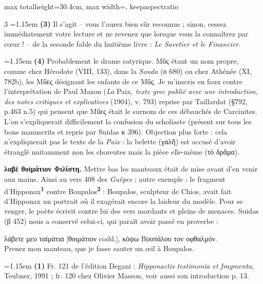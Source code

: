 \documentclass[11pt,twoside]{book}
\newcommand{\italique}[1]{\textit{#1}}
\newcommand{\citComm}[1]{\begin{quoting}[vskip=0.4pt,leftmargin=0.7em,rightmargin=0.2em]#1\end{quoting}}
\newcommand{\francais}[1]{{\policeFr #1}}
\newcommand{\marqueur}[1]{\textsuperscript{\color{rubricRed}\textbf{#1}}}
\begin{document}
\begin{adjustbox}{max totalheight=30.4cm, max width=\textwidth, keepaspectratio}
\begin{minipage}{\textwidth}
{\begin{multicols}{3}
\noindent\hangindent=1.15em {\color{sepiaNote}\textbf{(3)}} Il s'agit – vous l'aurez bien sûr reconnue ; sinon, cessez immédiatement votre lecture et ne revenez que lorsque vous la connaîtrez par cœur ! – de la seconde fable du huitième livre : \italique{Le Savetier et le Financier}.
\par\vspace{1.5pt}
\noindent\hangindent=1.15em {\color{sepiaNote}\textbf{(4)}} Probablement le drame satyrique. Μῦς étant un nom propre, comme chez Hérodote (VIII, 133), dans la \italique{Souda} (ο 680) ou chez Athénée (XI, 782b), les Μῦες désignant les enfants de ce Μῦς. Je m'inscris en faux contre l'interprétation de Paul Mazon (\italique{La} Paix\italique{, texte grec publié avec une introduction, des notes critiques et explicatives} (1904), v. 793) reprise par Taillardat (§792, p.463 n.5) qui pensent que Μῦες était le surnom de ces débauchés de Carcinites. L'on s'expliquerait difficilement la confusion du scholiaste (présent sur tous les bons manuscrits et repris par Suidas κ 396). Objection plus forte : cela n'expliquerait pas le texte de la \italique{Paix} : la belette (γαλῆ) est accusé d'avoir étranglé nuitamment non les choreutes mais la pièce elle-même (τὸ δρᾶμα).
\par\vspace{1.5pt}
 \textbf{λαβὲ θοἰμάτιον Φιλίστη.} Mettre bas les manteaux était de mise avant d'en venir aux mains. Ainsi au vers 408 des \italique{Guêpes} ; autre exemple : le fragment d'Hipponax\marqueur{1} contre Boupalos\marqueur{2} : Boupalos, sculpteur de Chios, avait fait d'Hipponax un portrait où il exagérait encore la laideur du modèle. Pour se venger, le poète écrivit contre lui des vers mordants et pleins de menaces. Suidas (β 452) nous a conservé celui-ci, qui paraît avoir passé en proverbe :
\citComm{λάβετε μευ ταἰμάτια [θοιμάτιον codd.], κόψω Βουπάλου τον οφθαλμόν.\\
\francais{Prenez mon manteau, que je fasse sauter un œil à Boupalos.}}
\par\vspace{1.5pt}
\par\vspace{1.2pt}\par\nopagebreak\vspace{1pt}\noindent\hangindent=1.15em {\color{sepiaNote}\textbf{(1)}} Fr. 121 de l'édition Degani : \italique{Hipponactis testimonia et fragmenta}, Teubner, 1991 ; fr. 120 chez Olivier Masson, voir aussi son introduction p. 13.

\end{multicols}}
\end{minipage}
\end{adjustbox}
\end{document}
